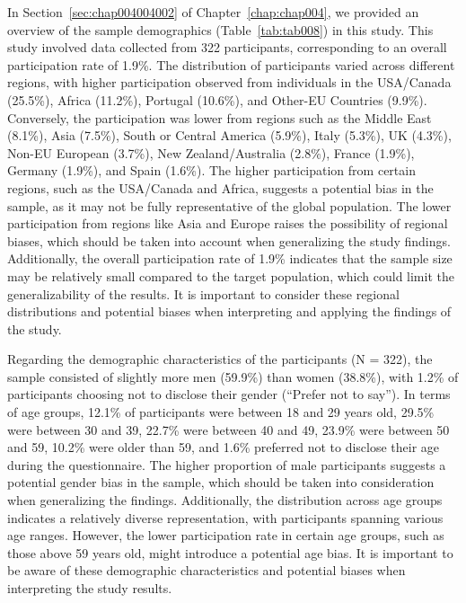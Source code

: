 In Section~\ref{sec:chap004004002} of Chapter~\ref{chap:chap004}, we provided an overview of the sample demographics (Table~\ref{tab:tab008}) in this study.
This study involved data collected from 322 participants, corresponding to an overall participation rate of 1.9\%.
The distribution of participants varied across different regions, with higher participation observed from individuals in the USA/Canada (25.5\%), Africa (11.2\%), Portugal (10.6\%), and Other-EU Countries (9.9\%).
Conversely, the participation was lower from regions such as the Middle East (8.1\%), Asia (7.5\%), South or Central America (5.9\%), Italy (5.3\%), UK (4.3\%), Non-EU European (3.7\%), New Zealand/Australia (2.8\%), France (1.9\%), Germany (1.9\%), and Spain (1.6\%).
The higher participation from certain regions, such as the USA/Canada and Africa, suggests a potential bias in the sample, as it may not be fully representative of the global population.
The lower participation from regions like Asia and Europe raises the possibility of regional biases, which should be taken into account when generalizing the study findings.
Additionally, the overall participation rate of 1.9\% indicates that the sample size may be relatively small compared to the target population, which could limit the generalizability of the results.
It is important to consider these regional distributions and potential biases when interpreting and applying the findings of the study.

Regarding the demographic characteristics of the participants (N = 322), the sample consisted of slightly more men (59.9\%) than women (38.8\%), with 1.2\% of participants choosing not to disclose their gender (``Prefer not to say'').
In terms of age groups, 12.1\% of participants were between 18 and 29 years old, 29.5\% were between 30 and 39, 22.7\% were between 40 and 49, 23.9\% were between 50 and 59, 10.2\% were older than 59, and 1.6\% preferred not to disclose their age during the questionnaire.
The higher proportion of male participants suggests a potential gender bias in the sample, which should be taken into consideration when generalizing the findings.
Additionally, the distribution across age groups indicates a relatively diverse representation, with participants spanning various age ranges.
However, the lower participation rate in certain age groups, such as those above 59 years old, might introduce a potential age bias.
It is important to be aware of these demographic characteristics and potential biases when interpreting the study results.

